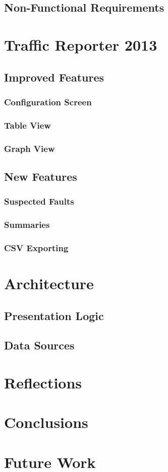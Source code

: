 \documentclass{article}
\begin{document}
\subsection{Non-Functional Requirements}

\section{Traffic Reporter 2013}
\subsection{Improved Features}
\subsubsection{Configuration Screen}
\subsubsection{Table View}
\subsubsection{Graph View}
\subsection{New Features}
\subsubsection{Suspected Faults}
\subsubsection{Summaries}
\subsubsection{CSV Exporting}

\section{Architecture}
\subsection{Presentation Logic}
\subsection{Data Sources}
\section{Reflections}
\section{Conclusions}

\section{Future Work}



\end{document}
